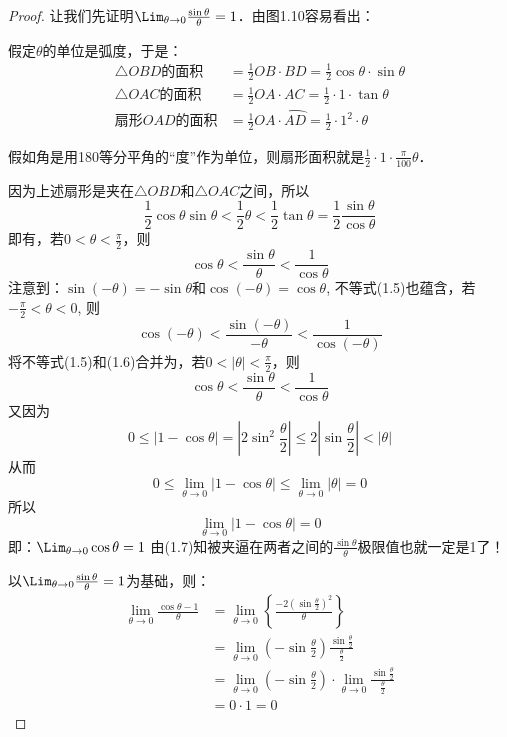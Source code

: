 \begin{proof}
    让我们先证明$\Lim_{\theta\to 0}\frac{\sin\theta }{\theta}=1$．由图1.10容易看出：

假定$\theta$的单位是弧度，于是：
\[\begin{split}
    \triangle OBD\text{的面积}&=\frac{1}{2}OB\cdot BD=\frac{1}{2}\cos\theta\cdot \sin\theta\\
    \triangle OAC\text{的面积}&=\frac{1}{2}OA\cdot AC=\frac{1}{2}\cdot 1\cdot \tan\theta\\
    \text{扇形$OAD$的面积}&=\frac{1}{2}OA\cdot \wideparen{AD}=\frac{1}{2}\cdot 1^2\cdot \theta
\end{split}\]

假如角是用180等分平角的“度”作为单位，则扇形面积就是$\frac{1}{2}\cdot 1\cdot \frac{\pi}{100}\theta$．

因为上述扇形是夹在$\triangle OBD$和$\triangle OAC$之间，所以
\begin{equation}
    \frac{1}{2}\cos\theta\sin\theta<\frac{1}{2}\theta<\frac{1}{2}\tan\theta=\frac{1}{2}\frac{\sin\theta}{\cos\theta}
\end{equation}
即有，若$0<\theta<\frac{\pi}{2}$，则
\begin{equation}
    \cos\theta<\frac{\sin\theta}{\theta}<\frac{1}{\cos\theta}
\end{equation}
注意到：$\sin(-\theta)=-\sin\theta$和$\cos(-\theta)=\cos\theta$, 不等式(1.5)也蕴含，若$-\frac{\pi}{2}<\theta<0$, 则
\begin{equation}
    \cos(-\theta)<\frac{\sin(-\theta)}{-\theta}<\frac{1}{\cos(-\theta)}
\end{equation}
将不等式(1.5)和(1.6)合并为，若$0<|\theta|<\frac{\pi}{2}$，则
\begin{equation}
    \cos\theta<\frac{\sin\theta}{\theta}<\frac{1}{\cos\theta}
\end{equation}
又因为
\[0\le |1-\cos\theta|=\left|2\sin^2\frac{\theta}{2}\right|\le 2\left|\sin\frac{\theta}{2}\right|<|\theta|\]
从而
\[0\le \lim_{\theta\to 0}|1-\cos\theta|\le \lim_{\theta\to 0}|\theta|=0\]
所以
\[\lim_{\theta\to 0}|1-\cos\theta|=0\]
即：$\Lim_{\theta\to 0}\cos\theta=1$
由(1.7)知被夹逼在两者之间的$\frac{\sin\theta}{\theta}$极限值也就一定是1了！

以$\Lim_{\theta\to 0}\frac{\sin\theta}{\theta}=1$为基础，则：
\[\begin{split}
\lim_{\theta\to 0}\frac{\cos\theta-1}{\theta}&=\lim_{\theta\to 0}\left\{\frac{-2\left(\sin\frac{\theta}{2}\right)^2}{\theta}\right\}\\
&= \lim_{\theta\to 0}\left(-\sin\frac{\theta}{2}\right)\frac{\sin\frac{\theta}{2}}{\frac{\theta}{2}}    \\
&=\lim_{\theta\to 0}\left(-\sin\frac{\theta}{2}\right)\cdot \lim_{\theta\to 0}\frac{\sin\frac{\theta}{2}}{\frac{\theta}{2}}   \\
&=0\cdot 1=0
\end{split}   
\]
\end{proof}

